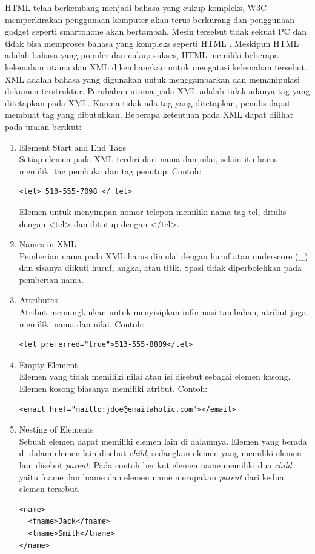 HTML telah berkembang menjadi bahasa yang cukup kompleks, W3C memperkirakan
penggunaan komputer akan terus berkurang dan penggunaan gadget seperti smartphone 
akan bertambah. Mesin tersebut tidak sekuat PC dan tidak bisa memproses bahasa yang 
kompleks seperti HTML . Meskipun HTML adalah bahasa yang populer dan cukup sukses, HTML 
memiliki beberapa kelemahan utama dan XML dikembangkan untuk mengatasi kelemahan tersebut. 
XML adalah bahasa yang digunakan untuk menggambarkan dan memanipulasi dokumen
terstruktur. Perubahan utama pada XML adalah tidak adanya tag yang ditetapkan pada XML. 
Karena tidak ada tag yang ditetapkan, penulis dapat membuat tag yang dibutuhkan. 
Beberapa ketentuan pada XML dapat dilihat pada uraian berikut:
\begin{enumerate}
\item Element Start and End Tags \\
Setiap elemen pada XML terdiri dari nama dan nilai, selain itu harus memiliki
tag pembuka dan tag penutup. Contoh: 
\begin{verbatim}
<tel> 513-555-7098 </ tel>
\end{verbatim}
Elemen untuk menyimpan nomor telepon memiliki nama tag tel, ditulis dengan <tel>
dan ditutup dengan </tel>.

\item Names in XML \\
Pemberian nama pada XML harus dimulai dengan huruf atau underscore (\_) dan
sisanya diikuti huruf, angka, atau titik. Spasi tidak diperbolehkan pada
pemberian nama.

\item Attributes \\
Atribut memungkinkan untuk menyisipkan informasi tambahan, atribut juga memiliki
nama dan nilai. Contoh:
\begin{verbatim}
<tel preferred="true">513-555-8889</tel>
\end{verbatim}

\item Empty Element \\
Elemen yang tidak memiliki nilai atau isi disebut sebagai elemen kosong. Elemen
kosong biasanya memiliki atribut. Contoh:
\begin{verbatim}
<email href="mailto:jdoe@emailaholic.com"></email>
\end{verbatim}

\item Nesting of Elements \\
Sebuah elemen dapat memiliki elemen lain di dalamnya. Elemen yang berada di
dalam elemen lain disebut \textit{child}, sedangkan elemen yang memiliki elemen
lain disebut \textit{parent}. Pada contoh berikut elemen name memiliki dua
\textit{child} yaitu fname dan lname dan elemen name merupakan \textit{parent}
dari kedua elemen tersebut. 
\begin{verbatim}
<name>
  <fname>Jack</fname>
  <lname>Smith</lname>
</name>
\end{verbatim}


\end{enumerate}
